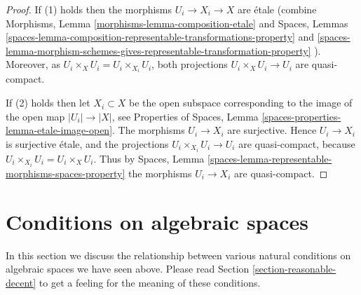 \begin{proof}
If (1) holds then the morphisms $U_i \to X_i \to X$ are \'etale (combine
Morphisms, Lemma \ref{morphisms-lemma-composition-etale}
and
Spaces, Lemmas
\ref{spaces-lemma-composition-representable-transformations-property} and
\ref{spaces-lemma-morphism-schemes-gives-representable-transformation-property}
).
Moreover, as $U_i \times_X U_i = U_i \times_{X_i} U_i$,
both projections $U_i \times_X U_i \to U_i$ are quasi-compact.

\medskip\noindent
If (2) holds then let $X_i \subset X$ be the open subspace corresponding
to the image of the open map $|U_i| \to |X|$, see
Properties of Spaces,
Lemma \ref{spaces-properties-lemma-etale-image-open}.
The morphisms $U_i \to X_i$ are surjective.
Hence $U_i \to X_i$ is surjective \'etale, and the projections
$U_i \times_{X_i} U_i \to U_i$ are quasi-compact, because
$U_i \times_{X_i} U_i = U_i \times_X U_i$. Thus by
Spaces, Lemma \ref{spaces-lemma-representable-morphisms-spaces-property}
the morphisms $U_i \to X_i$ are quasi-compact.
\end{proof}









\section{Conditions on algebraic spaces}
\label{section-conditions}

\noindent
In this section we discuss the relationship between various natural
conditions on algebraic spaces we have seen above. Please read
Section \ref{section-reasonable-decent}
to get a feeling for the meaning of these conditions.


